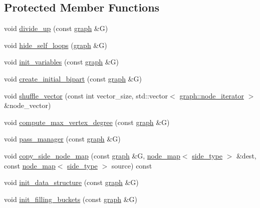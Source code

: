 \subsection*{Protected Member Functions}
\begin{DoxyCompactItemize}
\item 
void \mbox{\hyperlink{classfm__partition_ad768579b813500dc2d267aac5668ed48}{divide\+\_\+up}} (const \mbox{\hyperlink{classgraph}{graph}} \&G)
\item 
void \mbox{\hyperlink{classfm__partition_a3e3aa22119ff5ff9c406683e22ab6078}{hide\+\_\+self\+\_\+loops}} (\mbox{\hyperlink{classgraph}{graph}} \&G)
\item 
void \mbox{\hyperlink{classfm__partition_aad791ac648a9ff4694c8960f49dcc018}{init\+\_\+variables}} (const \mbox{\hyperlink{classgraph}{graph}} \&G)
\item 
void \mbox{\hyperlink{classfm__partition_a25ef3fc22bee176abfef64248484e8c0}{create\+\_\+initial\+\_\+bipart}} (const \mbox{\hyperlink{classgraph}{graph}} \&G)
\item 
void \mbox{\hyperlink{classfm__partition_a27915b38800483f897647f012b935f0a}{shuffle\+\_\+vector}} (const int vector\+\_\+size, std\+::vector$<$ \mbox{\hyperlink{classgraph_a2cb374b84c133ce13f94e73c3e5da7fa}{graph\+::node\+\_\+iterator}} $>$ \&node\+\_\+vector)
\item 
void \mbox{\hyperlink{classfm__partition_a5d0f409b6b1d554a62d67952236c7ce9}{compute\+\_\+max\+\_\+vertex\+\_\+degree}} (const \mbox{\hyperlink{classgraph}{graph}} \&G)
\item 
void \mbox{\hyperlink{classfm__partition_aec7b2a315bc003fbd98debd5cd879f99}{pass\+\_\+manager}} (const \mbox{\hyperlink{classgraph}{graph}} \&G)
\item 
void \mbox{\hyperlink{classfm__partition_a33d1dbba0ce9e398adab753f403deac3}{copy\+\_\+side\+\_\+node\+\_\+map}} (const \mbox{\hyperlink{classgraph}{graph}} \&G, \mbox{\hyperlink{classnode__map}{node\+\_\+map}}$<$ \mbox{\hyperlink{classfm__partition_a7cdff1bea3740a287387e8408e16ca79}{side\+\_\+type}} $>$ \&dest, const \mbox{\hyperlink{classnode__map}{node\+\_\+map}}$<$ \mbox{\hyperlink{classfm__partition_a7cdff1bea3740a287387e8408e16ca79}{side\+\_\+type}} $>$ source) const
\item 
void \mbox{\hyperlink{classfm__partition_a9aa27d4c97616c0fdbd00d11dc83bc0b}{init\+\_\+data\+\_\+structure}} (const \mbox{\hyperlink{classgraph}{graph}} \&G)
\item 
void \mbox{\hyperlink{classfm__partition_ac510befe1837c646a260a14c110d7a79}{init\+\_\+filling\+\_\+buckets}} (const \mbox{\hyperlink{classgraph}{graph}} \&G)

\end{DoxyCompactItemize}

